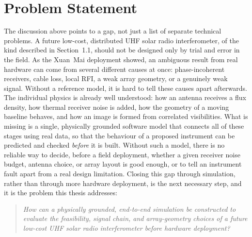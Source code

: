 \section{Problem Statement}
\label{sec:problem-statement}
The discussion above points to a gap, not just a list of separate technical
problems. A future low-cost, distributed UHF solar radio interferometer, of
the kind described in Section~1.1, should not be designed only by trial and
error in the field. As the Xuan~Mai deployment showed, an ambiguous result
from real hardware can come from several different causes at once:
phase-incoherent receivers, cable loss, local RFI, a weak array geometry, or a
genuinely weak signal. Without a reference model, it is hard to tell these
causes apart afterwards. The individual physics is already well understood:
how an antenna receives a flux density, how thermal receiver noise is added,
how the geometry of a moving baseline behaves, and how an image is formed from
correlated visibilities. What is missing is a single, physically grounded
software model that connects all of these stages using real data, so that the
behaviour of a proposed instrument can be predicted and checked \emph{before}
it is built. Without such a model, there is no reliable way to decide, before
a field deployment, whether a given receiver noise budget, antenna choice, or
array layout is good enough, or to tell an instrument fault apart from a real
design limitation. Closing this gap through simulation, rather than through
more hardware deployment, is the next necessary step, and it is the problem
this thesis addresses:

\begin{quote}\itshape
How can a physically grounded, end-to-end simulation be constructed to
evaluate the feasibility, signal chain, and array-geometry choices of a
future low-cost UHF solar radio interferometer before hardware deployment?
\end{quote}

